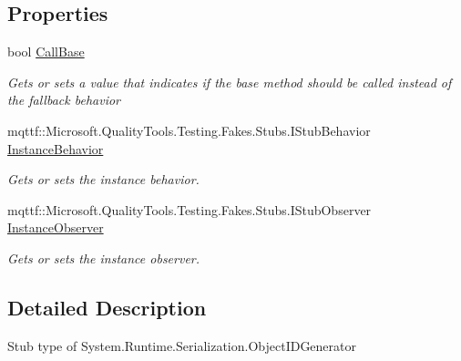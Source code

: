 \subsection*{Properties}
\begin{DoxyCompactItemize}
\item 
bool \hyperlink{class_system_1_1_runtime_1_1_serialization_1_1_fakes_1_1_stub_object_i_d_generator_a2c9ba5626209a39c8889586fe94c57d4}{Call\-Base}
\begin{DoxyCompactList}\small\item\em Gets or sets a value that indicates if the base method should be called instead of the fallback behavior\end{DoxyCompactList}\item 
mqttf\-::\-Microsoft.\-Quality\-Tools.\-Testing.\-Fakes.\-Stubs.\-I\-Stub\-Behavior \hyperlink{class_system_1_1_runtime_1_1_serialization_1_1_fakes_1_1_stub_object_i_d_generator_a65f2233368d97d94e368ef644f011914}{Instance\-Behavior}
\begin{DoxyCompactList}\small\item\em Gets or sets the instance behavior.\end{DoxyCompactList}\item 
mqttf\-::\-Microsoft.\-Quality\-Tools.\-Testing.\-Fakes.\-Stubs.\-I\-Stub\-Observer \hyperlink{class_system_1_1_runtime_1_1_serialization_1_1_fakes_1_1_stub_object_i_d_generator_a2ca6d8c4e19b1d65dd3e245b6fafd203}{Instance\-Observer}
\begin{DoxyCompactList}\small\item\em Gets or sets the instance observer.\end{DoxyCompactList}\end{DoxyCompactItemize}


\subsection{Detailed Description}
Stub type of System.\-Runtime.\-Serialization.\-Object\-I\-D\-Generator



